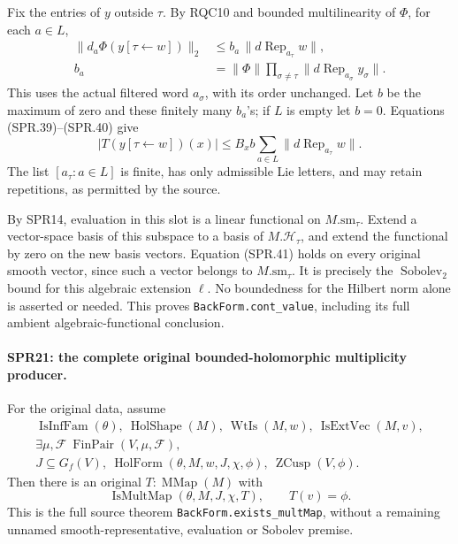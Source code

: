 \documentclass[11pt,a4paper]{article}
\numberwithin{equation}{section}
\theoremstyle{remark}\newtheorem{remark}[theorem]{Remark}
\begin{document}
Fix the entries of \(y\) outside \(\tau\).
By RQC10 and bounded multilinearity of \(\Phi\), for each \(a\in L\),
\[
\begin{split}
 \|d_a\Phi(y[\tau\leftarrow w])\|_2
 &\le b_a\,\|d\operatorname{Rep}_{a_\tau}w\|,\\
 b_a&=\|\Phi\|\prod_{\sigma\ne\tau}
                    \|d\operatorname{Rep}_{a_\sigma}y_\sigma\|.
\end{split}
\tag{SPR.40}
\]
This uses the actual filtered word \(a_\sigma\), with its order
unchanged.
Let \(b\) be the maximum of zero and these finitely many \(b_a\)'s;
if \(L\) is empty let \(b=0\).
Equations (SPR.39)--(SPR.40) give
\[
 |T(y[\tau\leftarrow w])(x)|
 \le B_xb\sum_{a\in L}
                         \|d\operatorname{Rep}_{a_\tau}w\|.
 \tag{SPR.41}
\]
The list \([a_\tau:a\in L]\) is finite, has only admissible Lie
letters, and may retain repetitions, as permitted by the source.

By SPR14, evaluation in this slot is a linear functional on
\(M.\mathrm{sm}_\tau\).
Extend a vector-space basis of this subspace to a basis of
\(M.\mathcal H_\tau\), and extend the functional by zero on the
new basis vectors.
Equation (SPR.41) holds on every original smooth vector, since
such a vector belongs to \(M.\mathrm{sm}_\tau\).
It is precisely the \(\operatorname{Sobolev}_2\) bound for this
algebraic extension \(\ell\).
No boundedness for the Hilbert norm alone is asserted or needed.
This proves \texttt{BackForm.\allowbreak cont\_\allowbreak value}, including its full
ambient algebraic-functional conclusion.

\paragraph{SPR21: the complete original bounded-holomorphic multiplicity producer.}
\label{claim:SPR21}
For the original data, assume
\[
\begin{gathered}
 \operatorname{IsInfFam}(\theta),\
 \operatorname{HolShape}(M),\
 \operatorname{WtIs}(M,w),\
 \operatorname{IsExtVec}(M,v),\\
 \exists\mu,\mathcal F\ \operatorname{FinPair}(V,\mu,\mathcal F),\\
 J\subseteq G_f(V),\
 \operatorname{HolForm}(\theta,M,w,J,\chi,\phi),\
 \operatorname{ZCusp}(V,\phi).
\end{gathered}
\tag{SPR.42}
\]
Then there is an original \(T:\operatorname{MMap}(M)\) with
\[
                   \operatorname{IsMultMap}(\theta,M,J,\chi,T),
                                  \qquad T(v)=\phi.
 \tag{SPR.43}
\]
This is the full source theorem
\texttt{BackForm.\allowbreak exists\_\allowbreak multMap}, without a remaining unnamed
smooth-representative, evaluation or Sobolev premise.
\end{document}
